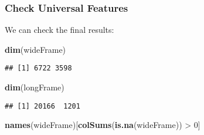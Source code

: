 \documentclass[10pt]{report}
\newenvironment{Shaded}{}{}
\newcommand{\KeywordTok}[1]{\textcolor[rgb]{0.00,0.44,0.13}{\textbf{{#1}}}}
\newcommand{\DecValTok}[1]{\textcolor[rgb]{0.25,0.63,0.44}{{#1}}}
\newcommand{\StringTok}[1]{\textcolor[rgb]{0.25,0.44,0.63}{{#1}}}
\newcommand{\NormalTok}[1]{{#1}}
\begin{document}
\begin{Shaded}
\end{Shaded}

\subsubsection{Check Universal
Features}\label{check-universal-features-1}

We can check the final results:

\begin{Shaded}
\begin{Highlighting}[]
\KeywordTok{dim}\NormalTok{(wideFrame)}
\end{Highlighting}
\end{Shaded}

\begin{verbatim}
## [1] 6722 3598
\end{verbatim}

\begin{Shaded}
\begin{Highlighting}[]
\KeywordTok{dim}\NormalTok{(longFrame)}
\end{Highlighting}
\end{Shaded}

\begin{verbatim}
## [1] 20166  1201
\end{verbatim}

\begin{Shaded}
\begin{Highlighting}[]
\KeywordTok{names}\NormalTok{(wideFrame)[}\KeywordTok{colSums}\NormalTok{(}\KeywordTok{is.na}\NormalTok{(wideFrame)) >}\StringTok{ }\DecValTok{0}\NormalTok{]}
\end{Highlighting}
\end{Shaded}
\end{document}
